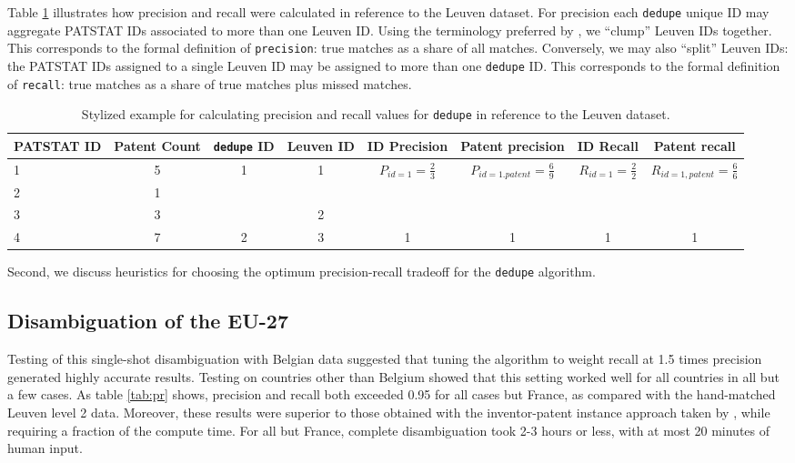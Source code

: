 \documentclass[11pt]{article}
\begin{document}
Table \ref{tab:precision-calc} illustrates how precision and recall
were calculated in reference to the Leuven dataset. For precision each
\texttt{dedupe} unique ID may aggregate PATSTAT IDs associated to more
than one Leuven ID. Using the terminology preferred by
\cite{lai2011disambiguation}, we ``clump'' Leuven IDs together. This
corresponds to the formal definition of \texttt{precision}: true
matches as a share of all matches. Conversely, we may also ``split''
Leuven IDs: the PATSTAT IDs assigned to a single Leuven ID may be
assigned to more than one \texttt{dedupe} ID. This corresponds to the
formal definition of \texttt{recall}: true matches as a share of true
matches plus missed matches.

\begin{landscape}
  \begin{table}[ht]
    \footnotesize
    \centering
    \begin{tabular}{l|c|c|c||c|c|c|c}
      PATSTAT ID & Patent Count & \texttt{dedupe} ID & Leuven ID & ID Precision &
      Patent precision & ID Recall & Patent recall\\
      \hline
      1 & 5 & \multirow{3}{*}{1} & \multirow{2}{*}{1} &
      \multirow{3}{*}{$P_{id=1} = \frac{2}{3}$} &
      \multirow{3}{*}{$P_{id=1. patent} = \frac{6}{9}$} &     
      \multirow{3}{*}{$R_{id=1} = \frac{2}{2}$} & 
      \multirow{3}{*}{$R_{id=1, patent} = \frac{6}{6}$}\\
      2 & 1 & & & & & &\\
      3 & 3 & & 2 & & & &\\
      \hline
      4 & 7 & 2 & 3 & 1 & 1 &1 & 1 \\
    \end{tabular}
    \caption{Stylized example for calculating precision and recall values for \texttt{dedupe} in
      reference to the Leuven dataset.}
    \label{tab:precision-calc}
  \end{table}
\end{landscape}


Second, we discuss heuristics for choosing the optimum
precision-recall tradeoff for the \texttt{dedupe} algorithm. 


\subsection{Disambiguation of the EU-27}
\label{sec:core-countries}

Testing of this single-shot disambiguation with Belgian data suggested
that tuning the algorithm to weight recall at 1.5 times precision
generated highly accurate results. Testing on countries other than
Belgium showed that this setting worked well for all countries in all
but a few cases. As table \ref{tab:pr} shows, precision and recall both
exceeded 0.95 for all cases but France, as compared with the
hand-matched Leuven level 2 data. Moreover, these results were
superior to those obtained with the inventor-patent instance approach
taken by \cite{lai2011disambiguation}, while requiring a fraction of
the compute time. For all but France, complete disambiguation took 2-3
hours or less, with at most 20 minutes of human input.
\end{document}
